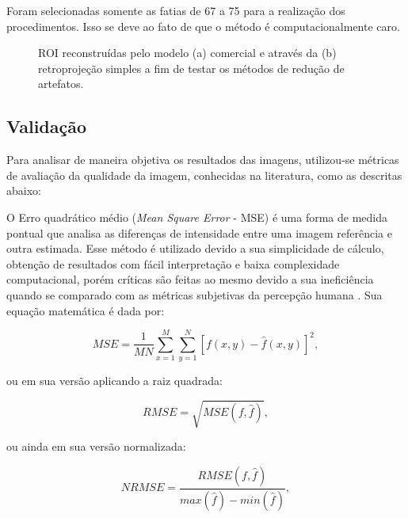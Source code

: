 Foram selecionadas somente as fatias de 67 a 75 para a realização dos procedimentos. Isso se deve ao fato de que o método é computacionalmente caro.

\begin{figure}[H]
	\centering
	
	\caption{\acs{ROI} reconstruídas pelo modelo (a) comercial e através da (b) retroprojeção simples a fim de testar os métodos de redução de artefatos.}
	
	\hfil
	
	\label{fig:imgCap4ROI}
\end{figure} 

\subsection{Validação} 

Para analisar de maneira objetiva os resultados das imagens, utilizou-se métricas de avaliação da qualidade da imagem, conhecidas na literatura, como as descritas abaixo:

O Erro quadrático médio (\textit{Mean Square Error} - \acs{MSE}) é uma forma de medida pontual que analisa as diferenças de intensidade entre uma imagem referência e outra estimada. Esse método é utilizado devido a sua simplicidade de cálculo, obtenção de resultados com fácil interpretação e baixa complexidade computacional, porém críticas são feitas ao mesmo devido a sua ineficiência quando se comparado com as métricas subjetivas da percepção humana \cite{gonzalez2008digital,wang2004image}. Sua equação matemática é dada por:

\begin{equation}
MSE = \dfrac{1}{MN} \sum_{x=1}^{M} \sum_{y=1}^{N} [f(x,y) - \hat{f}(x,y)]^{2},
\label{eq:eqCap4MSE}
\end{equation} 

\noindent ou em sua versão aplicando a raiz quadrada:

\begin{equation}
RMSE = \sqrt{MSE(f,\hat{f})},
\label{eq:eqCap4RMSE}
\end{equation}
 
\noindent ou ainda em sua versão normalizada:

\begin{equation}
NRMSE = \dfrac{RMSE(f,\hat{f})}{max(\hat{f}) - min(\hat{f})},
\label{eq:eqCap4NRMSE}
\end{equation}

